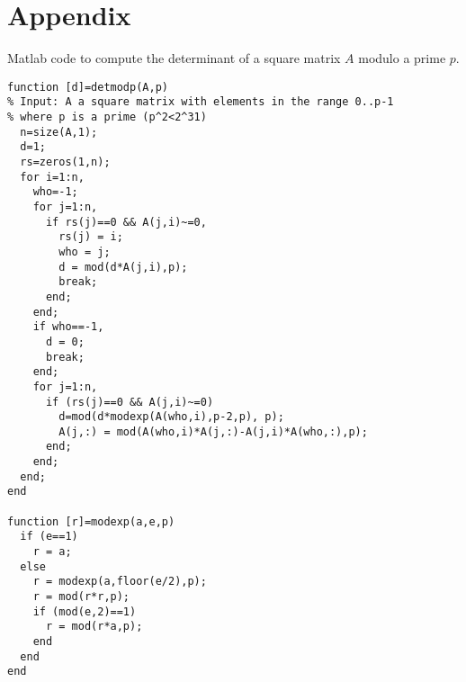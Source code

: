 \documentclass{tufte-handout}
\begin{document}
\section*{Appendix}
\noindent Matlab code to compute the determinant of a square matrix $A$ modulo a prime $p$.
\begin{verbatim}
function [d]=detmodp(A,p)
% Input: A a square matrix with elements in the range 0..p-1 
% where p is a prime (p^2<2^31)
  n=size(A,1);
  d=1;
  rs=zeros(1,n);	
  for i=1:n,
    who=-1;
    for j=1:n,
      if rs(j)==0 && A(j,i)~=0,
        rs(j) = i;
        who = j;
        d = mod(d*A(j,i),p);
        break;
      end;
    end;
    if who==-1,
      d = 0;
      break;
    end;
    for j=1:n,
      if (rs(j)==0 && A(j,i)~=0)
        d=mod(d*modexp(A(who,i),p-2,p), p);
        A(j,:) = mod(A(who,i)*A(j,:)-A(j,i)*A(who,:),p);
      end;
    end;
  end;
end

function [r]=modexp(a,e,p)
  if (e==1)
    r = a;
  else 
    r = modexp(a,floor(e/2),p);
    r = mod(r*r,p);
    if (mod(e,2)==1)
      r = mod(r*a,p);
    end
  end
end
\end{verbatim} 
\end{document}
